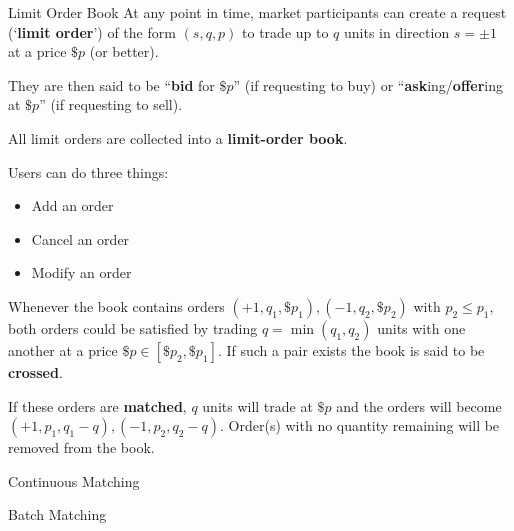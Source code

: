 \documentclass{beamer}
\begin{document}
\begin{frame}{Limit Order Book}%
	At any point in time, market participants can create a request (`\textbf{limit order}') of the form $(s,q,p)$ to trade up to $q$ units in direction $s=\pm1$ at a price $\$p$ (or better). %
	
	They are then said to be ``\textbf{bid} for $\$p$'' (if requesting to buy) or ``\textbf{ask}ing/\textbf{offer}ing at $\$p$'' (if requesting to sell). %

	\pause

	All limit orders are collected into a \textbf{limit-order book}.

	Users can do three things:
	\begin{itemize}
		\item Add an order
		\item Cancel an order
		\item Modify an order%
	\end{itemize}

	\pause

	Whenever the book contains orders $(+1,q_1,\$p_1), (-1,q_2,\$p_2)$ with $p_2\leq p_1$, both orders could be satisfied by trading $q=\min(q_1,q_2)$ units with one another at a price $\$p\in[\$p_2,\$p_1]$. If such a pair exists the book is said to be \textbf{crossed}.

	If these orders are \textbf{matched}, $q$ units will trade at $\$p$ and the orders will become $(+1,p_1,q_1-q), (-1,p_2,q_2-q)$. %
	Order(s) with no quantity remaining will be removed from the book.
\end{frame}

\begin{frame}{Continuous Matching}
\end{frame}

\begin{frame}{Batch Matching}
\end{frame}
\end{document}
